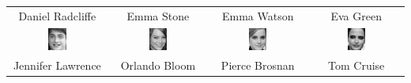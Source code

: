 \begin{table}[ht]
	\centering
	\begin{tabular}{|c|c|c|c|}
		\hline
		Daniel Radcliffe & Emma Stone & Emma Watson & Eva Green \\
		\includegraphics[width=0.2\textwidth]{images/recognition/Daniel_Radcliffe} & \includegraphics[width=0.2\textwidth]{images/recognition/Emma_Stone} & \includegraphics[width=0.2\textwidth]{images/recognition/Emma_Watson} & \includegraphics[width=0.2\textwidth]{images/recognition/Eva_Green} \\ \hline
		Jennifer Lawrence & Orlando Bloom & Pierce Brosnan & Tom Cruise \\

\end{tabular}
\end{table}
